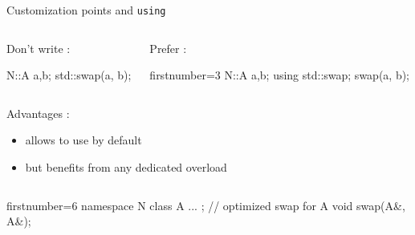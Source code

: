 \begin{frame}[fragile]
  \begin{block}{Customization points and \texttt{using}}
    \begin{columns}[t]
      \begin{column}{.35\textwidth}
        Don't write :
        \begin{cppcode*}{}
          N::A a,b;
          std::swap(a, b);
        \end{cppcode*}
      \end{column}
      \begin{column}{.35\textwidth}
        Prefer :
        \begin{cppcode*}{firstnumber=3}
          N::A a,b;
          using std::swap;
          swap(a, b);
        \end{cppcode*}
      \end{column}
    \end{columns}
    \vspace{.2cm}
    Advantages :
    \begin{itemize}
    \item allows to use  by default
    \item but benefits from any dedicated overload
    \end{itemize}
    \begin{columns}
      \begin{column}{.7\textwidth}
        \begin{cppcode*}{firstnumber=6}
          namespace N {
            class A { ... };
            // optimized swap for A
            void swap(A&, A&);
          }
        \end{cppcode*}
      \end{column}
    \end{columns}
  \end{block}
\end{frame}

